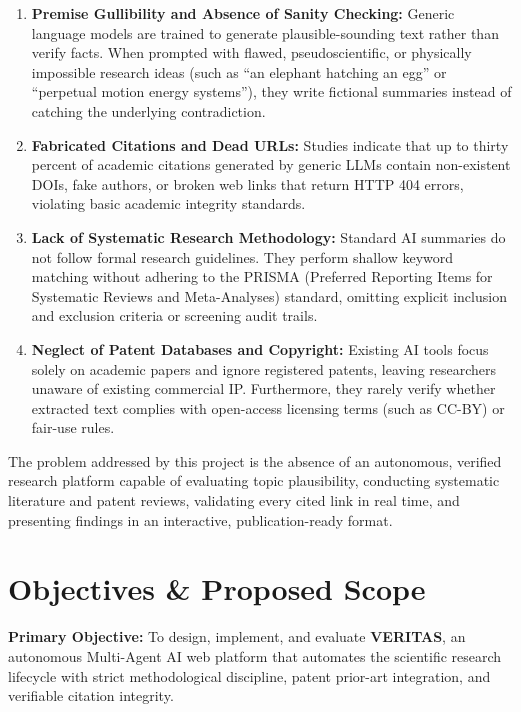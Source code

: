 \documentclass[11pt,a4paper]{article}
\begin{document}
\begin{enumerate}[leftmargin=*,noitemsep]
    \item \textbf{Premise Gullibility and Absence of Sanity Checking:} Generic language models are trained to generate plausible-sounding text rather than verify facts. When prompted with flawed, pseudoscientific, or physically impossible research ideas (such as ``an elephant hatching an egg'' or ``perpetual motion energy systems''), they write fictional summaries instead of catching the underlying contradiction.
    \item \textbf{Fabricated Citations and Dead URLs:} Studies indicate that up to thirty percent of academic citations generated by generic LLMs contain non-existent DOIs, fake authors, or broken web links that return HTTP 404 errors, violating basic academic integrity standards.
    \item \textbf{Lack of Systematic Research Methodology:} Standard AI summaries do not follow formal research guidelines. They perform shallow keyword matching without adhering to the PRISMA (Preferred Reporting Items for Systematic Reviews and Meta-Analyses) standard, omitting explicit inclusion and exclusion criteria or screening audit trails.
    \item \textbf{Neglect of Patent Databases and Copyright:} Existing AI tools focus solely on academic papers and ignore registered patents, leaving researchers unaware of existing commercial IP. Furthermore, they rarely verify whether extracted text complies with open-access licensing terms (such as CC-BY) or fair-use rules.
\end{enumerate}

The problem addressed by this project is the absence of an autonomous, verified research platform capable of evaluating topic plausibility, conducting systematic literature and patent reviews, validating every cited link in real time, and presenting findings in an interactive, publication-ready format.

\section{Objectives \& Proposed Scope}
\textbf{Primary Objective:} To design, implement, and evaluate \textbf{VERITAS}, an autonomous Multi-Agent AI web platform that automates the scientific research lifecycle with strict methodological discipline, patent prior-art integration, and verifiable citation integrity.
\end{document}
